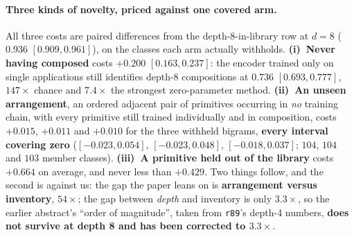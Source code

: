 \paragraph{Three kinds of novelty, priced against one covered arm.} All three costs are paired differences from the depth-8-in-library row at $d{=}8$ ($0.936$ $[0.909,0.961]$), on the classes each arm actually withholds. \textbf{(i)~Never having composed} costs $+0.200$ $[0.163,0.237]$: the encoder trained only on single applications still identifies depth-8 compositions at $0.736$ $[0.693,0.777]$, $147\times$ chance and $7.4\times$ the strongest zero-parameter method. \textbf{(ii)~An unseen arrangement}, an ordered adjacent pair of primitives occurring in \emph{no} training chain, with every primitive still trained individually and in composition, costs $+0.015$, $+0.011$ and $+0.010$ for the three withheld bigrams, \textbf{every interval covering zero} ($[-0.023,0.054]$, $[-0.023,0.048]$, $[-0.018,0.037]$; $104$, $104$ and $103$ member classes). \textbf{(iii)~A primitive held out of the library} costs $+0.664$ on average, and never less than $+0.429$. Two things follow, and the second is against us: the gap the paper leans on is \textbf{arrangement versus inventory}, $54\times$; the gap between \emph{depth} and inventory is only $\mathbf{3.3\times}$, so the earlier abstract's ``order of magnitude'', taken from \texttt{r89}'s depth-4 numbers, \textbf{does not survive at depth 8 and has been corrected to $3.3\times$}.

